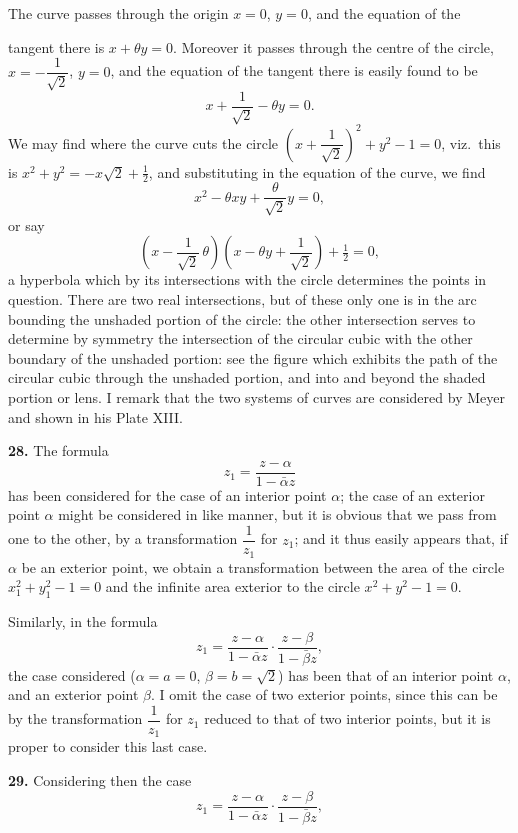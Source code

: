 \documentclass[11pt,a4paper]{article}
\begin{document}
The curve passes through the origin $x = 0$, $y = 0$, and the equation of the

tangent there is $x + \theta y = 0$. Moreover it passes through the centre of the circle, $x = -\dfrac{1}{\sqrt{2}}$, $y = 0$, and the equation of the tangent there is easily found to be
\[
x + \frac{1}{\sqrt{2}} - \theta y = 0.
\]
We may find where the curve cuts the circle $\left(x + \dfrac{1}{\sqrt{2}}\right)^2 + y^2 - 1 = 0$, viz.\ this is $x^2 + y^2 = -x\sqrt{2} + \tfrac{1}{2}$, and substituting in the equation of the curve, we find
\[
x^2 - \theta x y + \frac{\theta}{\sqrt{2}} y = 0,
\]
or say
\[
\left(x - \frac{1}{\sqrt{2}}\,\theta\right)\!\left(x - \theta y + \frac{1}{\sqrt{2}}\right) + \tfrac{1}{2} = 0,
\]
a hyperbola which by its intersections with the circle determines the points in question. There are two real intersections, but of these only one is in the arc bounding the unshaded portion of the circle: the other intersection serves to determine by symmetry the intersection of the circular cubic with the other boundary of the unshaded portion: see the figure which exhibits the path of the circular cubic through the unshaded portion, and into and beyond the shaded portion or lens. I remark that the two systems of curves are considered by Meyer and shown in his Plate XIII.

\textbf{28.} The formula
\[
z_1 = \frac{z - \alpha}{1 - \bar{\alpha}z}
\]
has been considered for the case of an interior point $\alpha$; the case of an exterior point $\alpha$ might be considered in like manner, but it is obvious that we pass from one to the other, by a transformation $\dfrac{1}{z_1}$ for $z_1$; and it thus easily appears that, if $\alpha$ be an exterior point, we obtain a transformation between the area of the circle $x_1^2 + y_1^2 - 1 = 0$ and the infinite area exterior to the circle $x^2 + y^2 - 1 = 0$.

Similarly, in the formula
\[
z_1 = \frac{z - \alpha}{1 - \bar{\alpha}z} \cdot \frac{z - \beta}{1 - \bar{\beta}z},
\]
the case considered ($\alpha = a = 0$, $\beta = b = \sqrt{2}$) has been that of an interior point $\alpha$, and an exterior point $\beta$. I omit the case of two exterior points, since this can be by the transformation $\dfrac{1}{z_1}$ for $z_1$ reduced to that of two interior points, but it is proper to consider this last case.

\textbf{29.} Considering then the case
\[
z_1 = \frac{z - \alpha}{1 - \bar{\alpha}z} \cdot \frac{z - \beta}{1 - \bar{\beta}z},
\]
\end{document}
